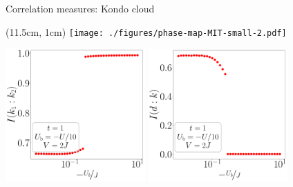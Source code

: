 \documentclass[aspectratio=169]{beamer}
\begin{document}
\begin{frame}[noframenumbering]{Correlation measures: Kondo cloud}
\begin{textblock*}{0.3\textwidth}(11.5cm, 1cm)
	\texttt{[image: ./figures/phase-map-MIT-small-2.pdf]}
\end{textblock*}
\includegraphics[width=0.4\textwidth]{./figures/corr-k-t=1.000,J=10.000,0.000,40,V=3J,Ubath=-U_by_10,N=4,U=1.000,1000.000,40.pdf}
\includegraphics[width=0.4\textwidth]{./figures/mi-dk-t=1.000,J=10.000,0.000,40,V=3J,Ubath=-U_by_10,N=4,U=1.000,1000.000,40.pdf}
\end{frame}
\end{document}
